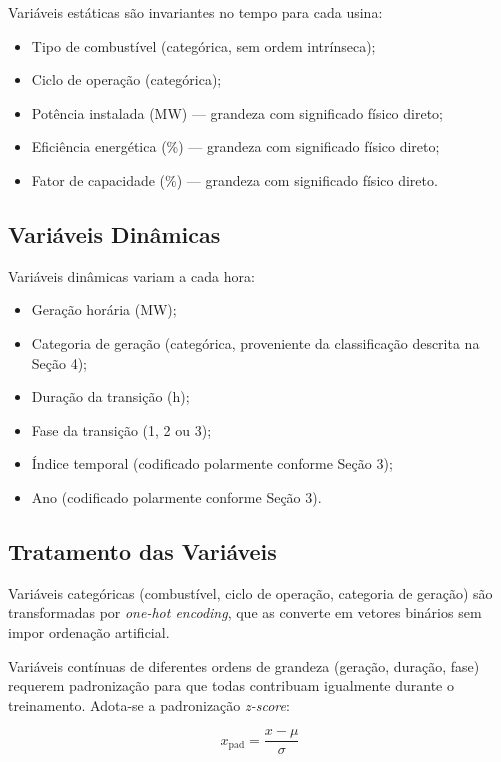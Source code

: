 Variáveis estáticas são invariantes no tempo para cada usina:
\begin{itemize}
    \item Tipo de combustível (categórica, sem ordem intrínseca);
    \item Ciclo de operação (categórica);
    \item Potência instalada (MW) — grandeza com significado físico direto;
    \item Eficiência energética (\%) — grandeza com significado físico direto;
    \item Fator de capacidade (\%) — grandeza com significado físico direto.
\end{itemize}

\subsection{Variáveis Dinâmicas}

Variáveis dinâmicas variam a cada hora:
\begin{itemize}
    \item Geração horária (MW);
    \item Categoria de geração (categórica, proveniente da classificação descrita na Seção 4);
    \item Duração da transição (h);
    \item Fase da transição (1, 2 ou 3);
    \item Índice temporal (codificado polarmente conforme Seção 3);
    \item Ano (codificado polarmente conforme Seção 3).
\end{itemize}

\subsection{Tratamento das Variáveis}

Variáveis categóricas (combustível, ciclo de operação, categoria de geração) são transformadas por \textit{one-hot encoding}, que as converte em vetores binários sem impor ordenação artificial.

Variáveis contínuas de diferentes ordens de grandeza (geração, duração, fase) requerem padronização para que todas contribuam igualmente durante o treinamento. Adota-se a padronização \textit{z-score}:

\begin{equation}
x_{\text{pad}} = \frac{x - \mu}{\sigma}
\label{eq:padronizacao}
\end{equation}

